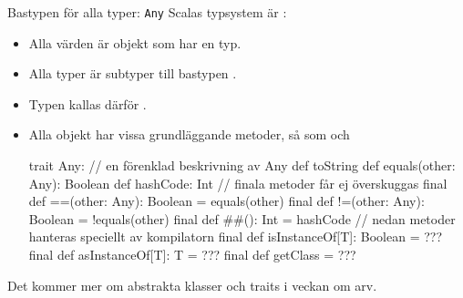 


\begin{Slide}{Bastypen för alla typer: \texttt{Any}}
\SlideFontSmall
Scalas typsystem är :
\begin{itemize}\SlideFontSmall
  \item Alla värden är objekt som har en typ.
  \item Alla typer är subtyper till bastypen .
  \item Typen  kallas därför .
  \item Alla objekt har vissa grundläggande metoder, så som  och \code{==}
\begin{Code}
trait Any:         // en förenklad beskrivning av Any
  def toString
  def equals(other: Any): Boolean
  def hashCode: Int
  // finala metoder får ej överskuggas
  final def ==(other: Any): Boolean = equals(other)
  final def !=(other: Any): Boolean = !equals(other)
  final def ##(): Int = hashCode
  // nedan metoder hanteras speciellt av kompilatorn
  final def isInstanceOf[T]: Boolean = ???  
  final def asInstanceOf[T]: T = ???
  final def getClass = ???
\end{Code}
\end{itemize}

Det kommer mer om abstrakta klasser och traits i veckan om arv.
\end{Slide}

